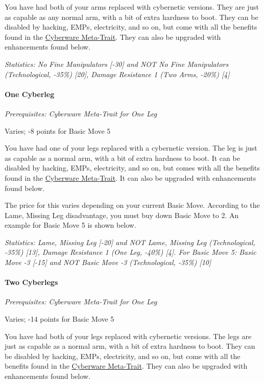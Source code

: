 \begin{multicols*}{3}
	You have had both of your arms replaced with cybernetic versions. They are just as capable as any normal arm, with a bit of extra hardness to boot. They can be disabled by hacking, EMPs, electricity, and so on, but come with all the benefits found in the \hyperref[cyberware-meta-trait]{Cyberware Meta-Trait}. They can also be upgraded with enhancements found below.
	
	\textit{\textcolor{OliveGreen}{Statistics:  No Fine Manipulators [-30] and NOT No Fine Manipulators (Technological, -35\%) [20], Damage Resistance 1 (Two Arms, -20\%) [4]}}
			
	\paragraph{One Cyberleg}
	\textit{Prerequisites:  Cyberware Meta-Trait for One Leg}
	\begin{flushright}
		Varies; -8 points for Basic Move 5
	\end{flushright}
	
	You have had one of your legs replaced with a cybernetic version. The leg is just as capable as a normal arm, with a bit of extra hardness to boot. It can be disabled by hacking, EMPs, electricity, and so on, but comes with all the benefits found in the \hyperref[cyberware-meta-trait]{Cyberware Meta-Trait}. It can also be upgraded with enhancements found below.
	
	The price for this varies depending on your current Basic Move. According to the Lame, Missing Leg disadvantage, you must buy down Basic Move to 2. An example for Basic Move 5 is shown below.	
	
	\textit{\textcolor{OliveGreen}{Statistics:  Lame, Missing Leg [-20] and NOT Lame, Missing Leg (Technological, -35\%) [13], Damage Resistance 1 (One Leg, -40\%) [4]. For Basic Move 5: Basic Move -3 [-15] and NOT Basic Move -3 (Technological, -35\%) [10]}}
	
	\paragraph{Two Cyberlegs}
	\textit{Prerequisites:  Cyberware Meta-Trait for One Leg}
	\begin{flushright}
		Varies; -14 points for Basic Move 5
	\end{flushright}

	You have had both of your legs replaced with cybernetic versions. The legs are just as capable as a normal arm, with a bit of extra hardness to boot. They can be disabled by hacking, EMPs, electricity, and so on, but come with all the benefits found in the \hyperref[cyberware-meta-trait]{Cyberware Meta-Trait}. They can also be upgraded with enhancements found below.
	

\end{multicols*}
